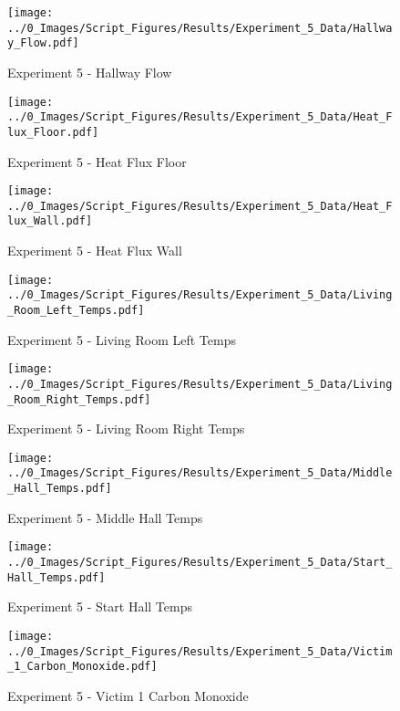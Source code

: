 	\clearpage

	\begin{figure}[H]
		\centering
		\texttt{[image: ../0\_Images/Script\_Figures/Results/Experiment\_5\_Data/Hallway\_Flow.pdf]}
		\caption[]{Experiment 5 - Hallway Flow}
	\end{figure}
 

	\begin{figure}[H]
		\centering
		\texttt{[image: ../0\_Images/Script\_Figures/Results/Experiment\_5\_Data/Heat\_Flux\_Floor.pdf]}
		\caption[]{Experiment 5 - Heat Flux Floor}
	\end{figure}
 
	\clearpage

	\begin{figure}[H]
		\centering
		\texttt{[image: ../0\_Images/Script\_Figures/Results/Experiment\_5\_Data/Heat\_Flux\_Wall.pdf]}
		\caption[]{Experiment 5 - Heat Flux Wall}
	\end{figure}
 

	\begin{figure}[H]
		\centering
		\texttt{[image: ../0\_Images/Script\_Figures/Results/Experiment\_5\_Data/Living\_Room\_Left\_Temps.pdf]}
		\caption[]{Experiment 5 - Living Room Left Temps}
	\end{figure}
 
	\clearpage

	\begin{figure}[H]
		\centering
		\texttt{[image: ../0\_Images/Script\_Figures/Results/Experiment\_5\_Data/Living\_Room\_Right\_Temps.pdf]}
		\caption[]{Experiment 5 - Living Room Right Temps}
	\end{figure}
 

	\begin{figure}[H]
		\centering
		\texttt{[image: ../0\_Images/Script\_Figures/Results/Experiment\_5\_Data/Middle\_Hall\_Temps.pdf]}
		\caption[]{Experiment 5 - Middle Hall Temps}
	\end{figure}
 
	\clearpage

	\begin{figure}[H]
		\centering
		\texttt{[image: ../0\_Images/Script\_Figures/Results/Experiment\_5\_Data/Start\_Hall\_Temps.pdf]}
		\caption[]{Experiment 5 - Start Hall Temps}
	\end{figure}
 

	\begin{figure}[H]
		\centering
		\texttt{[image: ../0\_Images/Script\_Figures/Results/Experiment\_5\_Data/Victim\_1\_Carbon\_Monoxide.pdf]}
		\caption[]{Experiment 5 - Victim 1 Carbon Monoxide}
	\end{figure}
 
